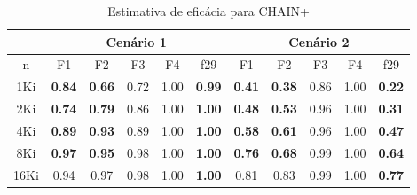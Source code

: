 \begin{table}[ht]
    \tiny
    \centering
    \caption{Estimativa de eficácia para CHAIN+\label{plus-chain-effect}}
    \begin{tabular}{c|ccccc|ccccc}
        \toprule
        & \multicolumn{5}{c}{Cenário 1} & \multicolumn{5}{c}{Cenário 2} \\
        \midrule
        n        & F1            & F2            & F3   & F4   & f29           & F1            & F2            & F3   & F4   & f29  \\
        \midrule
        1Ki      & \textbf{0.84} & \textbf{0.66} & 0.72 & 1.00 & \textbf{0.99} & \textbf{0.41} & \textbf{0.38} & 0.86 & 1.00 & \textbf{0.22} \\
        2Ki      & \textbf{0.74} & \textbf{0.79} & 0.86 & 1.00 & \textbf{1.00} & \textbf{0.48} & \textbf{0.53} & 0.96 & 1.00 & \textbf{0.31} \\
        4Ki      & \textbf{0.89} & \textbf{0.93} & 0.89 & 1.00 & \textbf{1.00} & \textbf{0.58} & \textbf{0.61} & 0.96 & 1.00 & \textbf{0.47} \\
        8Ki      & \textbf{0.97} & \textbf{0.95} & 0.98 & 1.00 & \textbf{1.00} & \textbf{0.76} & \textbf{0.68} & 0.99 & 1.00 & \textbf{0.64} \\
        16Ki     & 0.94          & 0.97          & 0.98 & 1.00 & \textbf{1.00} & 0.81          & 0.83          & 0.99 & 1.00 & \textbf{0.77} \\
        \bottomrule
    \end{tabular}
\end{table}
